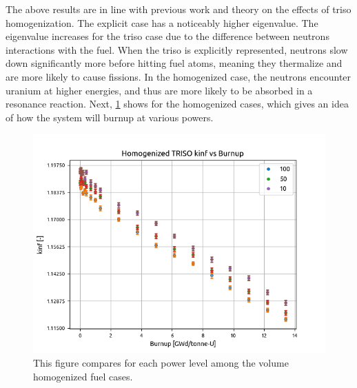 \documentclass[letterpaper]{physor2024}
\begin{document}
The above results are in line with previous work and theory on the effects of \gls{triso} homogenization. The explicit case has a noticeably higher eigenvalue. The eigenvalue increases for the \gls{triso} case due to the difference between neutrons interactions with the fuel. When the \gls{triso} is explicitly represented, neutrons slow down significantly more before hitting fuel atoms, meaning they thermalize and are more likely to cause fissions. In the homogenized case, the neutrons encounter uranium at higher energies, and thus are more likely to be absorbed in a resonance reaction. Next, \cref{fig:all_powers_kinf_vs_burnup} shows \kinf for the homogenized cases, which gives an idea of how the system will burnup at various powers.
\vspace*{-0.45cm}
\begin{figure}[!h]
    \centering
    \includegraphics[width=0.6\linewidth]{figures/all_homog_burnup_as_function_of_keff.png}
    \caption{This figure compares \kinf for each power level among the volume homogenized fuel cases.}
    \label{fig:all_powers_kinf_vs_burnup}
\end{figure}
\end{document}

